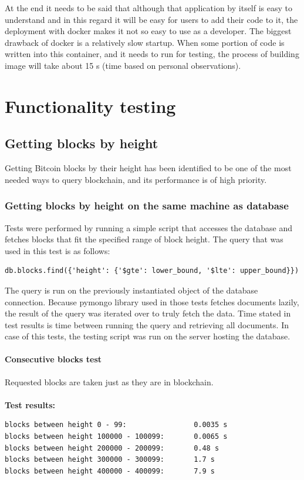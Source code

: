 \documentclass[12pt, en, eng, oneside, final]{mgr}
\begin{document}
At the end it needs to be said that although that application by itself is easy to understand and in this regard it will be easy for users to add their code to it, the deployment with docker makes it not so easy to use as a developer. The biggest drawback of docker is a relatively slow startup. When some portion of code is written into this container, and it needs to run for testing, the process of building image will take about 15 s (time based on personal observations).

\chapter{Functionality testing}

\section{Getting blocks by height}
Getting Bitcoin blocks by their height has been identified to be one of the most needed ways to query blockchain, and its performance is of high priority.

 
\subsection{Getting blocks by height on the same machine as database} 
Tests were performed by running a simple script that accesses the database and fetches blocks that fit the specified range of block height. The query that was used in this test is as follows: 
\begin{verbatim}
db.blocks.find({'height': {'$gte': lower_bound, '$lte': upper_bound}})
\end{verbatim}
The query is run on the previously instantiated object of the database connection. Because pymongo library used in those tests fetches documents lazily, the result of the query was iterated over to truly fetch the data. Time stated in test results is time between running the query and retrieving all documents. In case of this tests, the testing script was run on the server hosting the database.

\subsubsection{Consecutive blocks test}
Requested blocks are taken just as they are in blockchain.
\\
\\
\textbf{Test results:}
\begin{verbatim}
blocks between height 0 - 99:                0.0035 s
blocks between height 100000 - 100099:       0.0065 s
blocks between height 200000 - 200099:       0.48 s
blocks between height 300000 - 300099:       1.7 s
blocks between height 400000 - 400099:       7.9 s
\end{verbatim}
\end{document}
